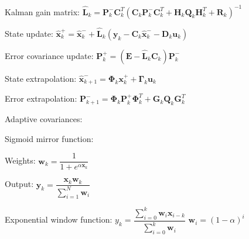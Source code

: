 \documentclass[class=article, crop=false]{standalone}
\begin{document}
Kalman gain matrix: $ \hat{\textbf{L}}_k = \textbf{P}^-_k \textbf{C}^T_k (\textbf{C}_k \textbf{P}^-_k \textbf{C}^T_k + \textbf{H}_k \textbf{Q}_k \textbf{H}^T_k + \textbf{R}_k)^{-1} $

State update: $ \hat{\textbf{x}}^+_k = \hat{\textbf{x}}^-_k + \hat{\textbf{L}}_k (\textbf{y}_k - \textbf{C}_k \hat{\textbf{x}}^-_k - \textbf{D}_k \textbf{u}_k) $

Error covariance update: $ \textbf{P}^+_k = (\textbf{E} - \hat{\textbf{L}}_k \textbf{C}_k ) \textbf{P}^-_k $

State extrapolation: $ \hat{\textbf{x}}^-_{k+1} = \boldsymbol{\Phi}_k \textbf{x}^+_k + \boldsymbol{\Gamma}_k \textbf{u}_k $

Error extrapolation: $ \textbf{P}^-_{k+1} = \boldsymbol{\Phi}_k \textbf{P}^+_k \boldsymbol{\Phi}^T_k + \textbf{G}_k \textbf{Q}_k \textbf{G}^T_k $


Adaptive covariances:

Sigmoid mirror function:

Weights:
$ \textbf{w}_k = \dfrac{ 1 }{ 1 + e^{\alpha \textbf{x}_k} } $

Output:
$ \textbf{y}_k = \dfrac{\textbf{x}_k \textbf{w}_k}{ \sum_{i=1}^{N} \textbf{w}_i } $

Exponential window function:
$ y_k = \dfrac{\sum_{i=0}^{k} \textbf{w}_i \textbf{x}_{i-k}}{ \sum_{i=0}^{k} \textbf{w}_i} $
$ \textbf{w}_i = (1 - \alpha)^i $
\end{document}
